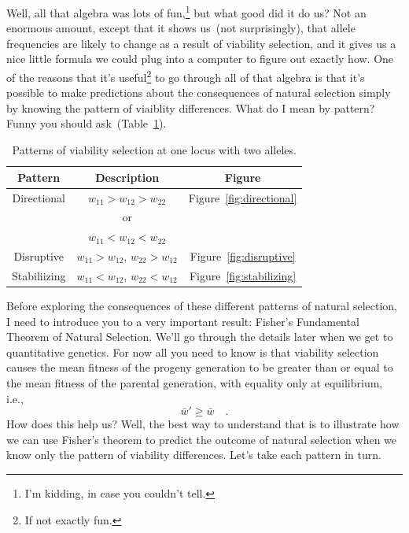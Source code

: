 Well, all that algebra was lots of fun,\footnote{I'm kidding, in case
  you couldn't tell.} but what good did it do us? Not an enormous
amount, except that it shows us~(not surprisingly), that allele
frequencies are likely to change as a result of viability selection,
and it gives us a nice little formula we could plug into a computer to
figure out exactly how. One of the reasons that it's
useful\footnote{If not exactly fun.} to go through all of that algebra
is that it's possible to make predictions about the consequences of
natural selection simply by knowing the pattern of viaiblity
differences. What do I mean by pattern? Funny you should
ask~(Table~\ref{table:patterns}).

\begin{table}
\begin{center}
\begin{tabular}{ccc}
\hline\hline
Pattern & Description & Figure \\
\hline
Directional & $w_{11} > w_{12} > w_{22}$ & Figure~\ref{fig:directional} \\
            & or \\
            & $w_{11} < w_{12} < w_{22}$ & \\
Disruptive  & $w_{11} > w_{12}$, $w_{22} > w_{12}$
                                         & Figure~\ref{fig:disruptive} \\
Stabiliizing& $w_{11} < w_{12}$, $w_{22} < w_{12}$
                                         & Figure~\ref{fig:stabilizing} \\
\hline
\end{tabular}
\end{center}
\caption{Patterns of viability selection at one locus with two alleles.}\label{table:patterns}
\end{table}

Before exploring the consequences of these different patterns of
natural selection, I need to introduce you to a very important result:
Fisher's Fundamental Theorem of Natural Selection. We'll go through
the details later when we get to quantitative genetics. For now all
you need to know is that viability selection causes the mean fitness
of the progeny generation to be greater than or equal to the mean
fitness of the parental generation, with equality only at equilibrium,
i.e.,
\[
\bar w' \ge \bar w \quad .
\]
How does this help us? Well, the best way to understand that is to
illustrate how we can use Fisher's theorem to predict the outcome of
natural selection when we know only the pattern of viability
differences. Let's take each pattern in turn.

